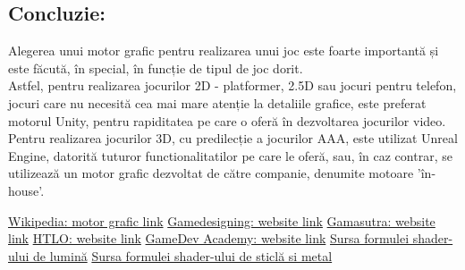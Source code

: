 \documentclass[12pt]{article}
\begin{document}
\subsection{Concluzie:}
\hspace{15pt} Alegerea unui motor grafic pentru realizarea unui joc este foarte importantă și este făcută, în special, în funcție de tipul de joc dorit. \\

Astfel, pentru realizarea jocurilor 2D - platformer, 2.5D sau jocuri pentru telefon, jocuri care nu necesită cea mai mare atenție la detaliile grafice, este preferat motorul Unity, pentru rapiditatea pe care o oferă în dezvoltarea jocurilor video. \\

Pentru realizarea jocurilor 3D, cu predilecție a jocurilor AAA, este utilizat Unreal Engine, datorită tuturor functionalitatilor pe care le oferă, sau, în caz contrar, se utilizează un motor grafic dezvoltat de către companie, denumite motoare 'în-house'.

\newpage
\begin{thebibliography}{}
\href{https://ro.wikipedia.org/wiki/Motor_grafic}{Wikipedia: motor grafic link}
\href{https://www.gamedesigning.org/career/video-game-engines/}{Gamedesigning: website link}
\href{https://www.gamasutra.com/}{Gamasutra: website link}
\href{https://www.htlo.co.uk/unity-vs-unreal-engine-a-quick-comparison/}{HTLO: website link}
\href{https://gamedevacademy.org/unity-vs-unreal/}{GameDev Academy: website link}
\href{http://ogldev.atspace.co.uk/www/tutorial20/tutorial20.html}{Sursa formulei shader-ului de lumină}
\href{https://cs.brown.edu/courses/cs123/labs/lab09.pdf}{Sursa formulei shader-ului de sticlă si metal}
\end{thebibliography}
\end{document}
